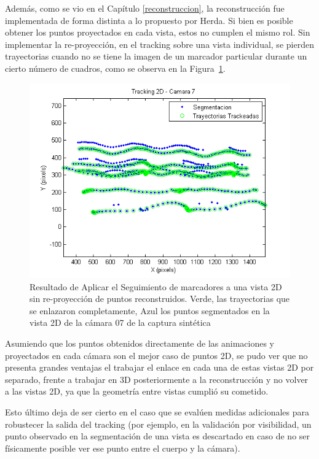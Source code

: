 Además, como se vio en el Capítulo \ref{reconstruccion}, la reconstrucción fue implementada de forma distinta a lo propuesto por Herda. Si bien es posible obtener los puntos proyectados en cada vista, estos no cumplen el mismo rol. Sin implementar la re-proyección, en el tracking sobre una vista individual, se pierden trayectorias cuando no se tiene la imagen de un marcador particular durante un cierto número de cuadros, como se observa en la Figura~\ref{tracking_2D_cam_07}.
\vspace{-0.2cm}
\begin{figure}[ht!]
\begin{center}
\includegraphics[scale=0.7]{img/Tracking/011_tracking_2D_camara_07.png}
\end{center}
\vspace{-0.8cm}
\caption{Resultado de Aplicar el Seguimiento de marcadores a una vista 2D sin re-proyección de puntos reconstruidos. Verde, las trayectorias que se enlazaron completamente, Azul los puntos segmentados en la vista 2D de la cámara 07 de la captura sintética}
\label{tracking_2D_cam_07}
\end{figure}

Asumiendo que los puntos obtenidos directamente de las animaciones y proyectados en cada cámara son el mejor caso de puntos 2D, se pudo ver que no presenta grandes ventajas el trabajar el enlace en cada una de estas vistas 2D por separado, frente a trabajar en 3D posteriormente a la reconstrucción y no volver a las vistas 2D, ya que la geometría entre vistas cumplió su cometido. 


Esto último deja de ser cierto en el caso que se evalúen medidas adicionales para robustecer la salida del tracking (por ejemplo, en la validación por visibilidad, un punto observado en la segmentación de una vista es descartado en caso de no ser físicamente posible ver ese punto entre el cuerpo y la cámara).

